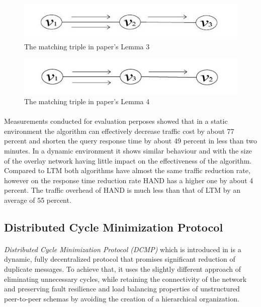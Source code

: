 \documentclass[a4paper,10pt]{article}
\begin{document}
\begin{figure}
\centering
  \includegraphics[scale=0.4]{img/hand_matchtriple_lemma3.jpeg}
\caption{The matching triple in paper's Lemma 3}
\label{figure:hand_matchtriple_lemma3}
\end{figure}

\begin{figure}
\centering
  \includegraphics[scale=0.4]{img/hand_matchtriple_lemma4.jpeg}
\caption{The matching triple in paper's Lemma 4}
\label{figure:hand_matchtriple_lemma4}
\end{figure}

\paragraph{}
Measurements conducted for evaluation perposes showed that in a static environment the algorithm can effectively decrease traffic cost by about 77 percent and shorten the query response time by about 49 percent in less than two minutes. In a dynamic environment it shows similar behaviour and with the size of the overlay network having little impact on the effectiveness of the algorithm. Compared to LTM both algorithms have almost the same traffic reduction rate, however on the response time reduction rate HAND has a higher one by about 4 percent. The traffic overhead of HAND is much less than that of LTM by an average of 55 percent.

\subsection{Distributed Cycle Minimization Protocol}

\paragraph{}
\emph{Distributed Cycle Minimization Protocol (DCMP)} which is introduced in \cite{zhu_dcmp_2008} is a dynamic, fully decentralized protocol that promises significant reduction of duplicate messages. To achieve that, it uses the slightly different approach of eliminating unnecessary cycles, while retaining the connectivity of the network and preserving fault resilience and load balancing properties of unstructured peer-to-peer schemas by avoiding the creation of a hierarchical organization.
\end{document}
